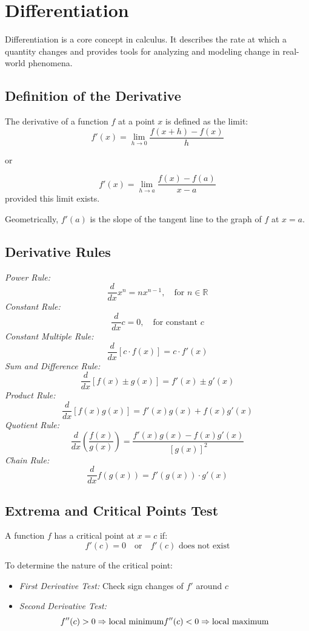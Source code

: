 \section{Differentiation}

Differentiation is a core concept in calculus. It describes the rate at which a quantity changes and provides tools for analyzing and modeling change in real-world phenomena.

\subsection{Definition of the Derivative}

The derivative of a function \(f\) at a point \(x\) is defined as the limit:
\[
f'(x) = \lim_{h \to 0} \frac{f(x + h) - f(x)}{h}
\]

or

\[f'(x) = \lim_{h \to a}\frac{f(x) - f(a)}{x - a}\]
provided this limit exists.

Geometrically, \(f'(a)\) is the slope of the tangent line to the graph of \(f\) at \(x = a\).

\subsection{Derivative Rules}

\emph{Power Rule:}
\[
\frac{d}{dx} x^n = nx^{n - 1}, \quad \text{for } n \in \mathbb{R}
\]
\emph{Constant Rule:}
\[
\frac{d}{dx} c = 0, \quad \text{for constant } c
\]
\emph{Constant Multiple Rule:}
\[
\frac{d}{dx} [c \cdot f(x)] = c \cdot f'(x)
\]
\emph{Sum and Difference Rule:}
\[
\frac{d}{dx} [f(x) \pm g(x)] = f'(x) \pm g'(x)
\]
\emph{Product Rule:}
\[
\frac{d}{dx} [f(x)g(x)] = f'(x)g(x) + f(x)g'(x)
\]
\emph{Quotient Rule:}
\[
\frac{d}{dx} \left( \frac{f(x)}{g(x)} \right) = \frac{f'(x)g(x) - f(x)g'(x)}{[g(x)]^2}
\]
\emph{Chain Rule:}
\[
\frac{d}{dx} f(g(x)) = f'(g(x)) \cdot g'(x)
\]

\subsection{Extrema and Critical Points Test}

A function \(f\) has a critical point at \(x = c\) if:
\[
f'(c) = 0 \quad \text{or} \quad f'(c) \text{ does not exist}
\]

To determine the nature of the critical point:
\begin{itemize}[label=\(-\)]
\item \emph{First Derivative Test:} Check sign changes of \(f'\) around \(c\)
\item \emph{Second Derivative Test:}
\[
f''(c) > 0 \Rightarrow \text{local minimum} \\
f''(c) < 0 \Rightarrow \text{local maximum}
\]
\end{itemize}

